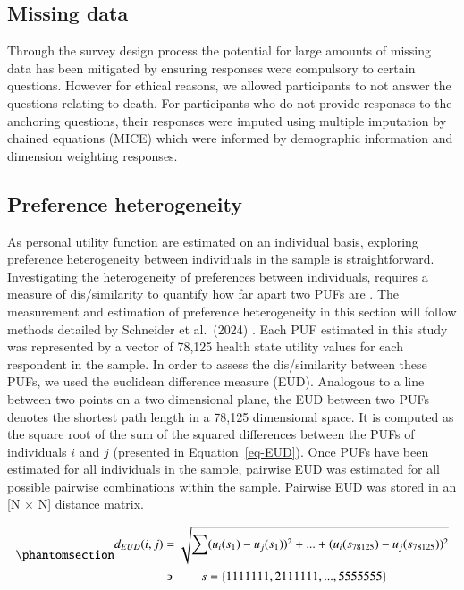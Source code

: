 \documentclass[
  number,
  preprint]{elsarticle}
\begin{document}
\subsection{Missing data}\label{missing-data}

Through the survey design process the potential for large amounts of
missing data has been mitigated by ensuring responses were compulsory to
certain questions. However for ethical reasons, we allowed participants
to not answer the questions relating to death. For participants who do
not provide responses to the anchoring questions, their responses were
imputed using multiple imputation by chained equations (MICE)
\citep{White2011MultiplePractice} which were informed by demographic
information and dimension weighting responses.

\subsection{Preference heterogeneity}\label{preference-heterogeneity}

As personal utility function are estimated on an individual basis,
exploring preference heterogeneity between individuals in the sample is
straightforward. Investigating the heterogeneity of preferences between
individuals, requires a measure of dis/similarity to quantify how far
apart two PUFs are \citep{Schneider2024ExploringLevel}. The measurement
and estimation of preference heterogeneity in this section will follow
methods detailed by Schneider et al.~(2024)
\citep{Schneider2024ExploringLevel}. Each PUF estimated in this study
was represented by a vector of 78,125 health state utility values for
each respondent in the sample. In order to assess the dis/similarity
between these PUFs, we used the euclidean difference measure (EUD).
Analogous to a line between two points on a two dimensional plane, the
EUD between two PUFs denotes the shortest path length in a 78,125
dimensional space. It is computed as the square root of the sum of the
squared differences between the PUFs of individuals \(i\) and \(j\)
(presented in Equation~\ref{eq-EUD}). Once PUFs have been estimated for
all individuals in the sample, pairwise EUD was estimated for all
possible pairwise combinations within the sample. Pairwise EUD was
stored in an {[}N \(\times\) N{]} distance matrix.

\begin{equation}\phantomsection\label{eq-EUD}{ 
  \begin{aligned}
    d_{EUD}(i,j) & =\sqrt{\sum_{}^{}(u_{i}(s_{1})-u_{j}(s_{1}))^{2}+ ... +(u_{i}(s_{78125})-u_{j}(s_{78125}))^{2}}\\
      & \backepsilon \quad \quad s = \{1111111, 2111111, ..., 5555555\}\\
  \end{aligned}
}\end{equation}
\end{document}

